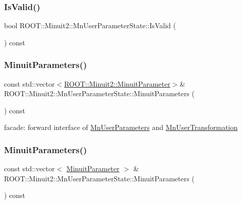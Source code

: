 \subsubsection{\texorpdfstring{IsValid()}{IsValid()}\hspace{0.1cm}{\footnotesize\ttfamily [2/2]}}
{\footnotesize\ttfamily bool R\+O\+O\+T\+::\+Minuit2\+::\+Mn\+User\+Parameter\+State\+::\+Is\+Valid (\begin{DoxyParamCaption}{ }\end{DoxyParamCaption}) const\hspace{0.3cm}{\ttfamily [inline]}}

\mbox{\label{classROOT_1_1Minuit2_1_1MnUserParameterState_ae37b475c33d32103702769cbfb1af5a4}} 
\subsubsection{\texorpdfstring{MinuitParameters()}{MinuitParameters()}\hspace{0.1cm}{\footnotesize\ttfamily [1/2]}}
{\footnotesize\ttfamily const std\+::vector$<$\mbox{\hyperlink{classROOT_1_1Minuit2_1_1MinuitParameter}{R\+O\+O\+T\+::\+Minuit2\+::\+Minuit\+Parameter}}$>$\& R\+O\+O\+T\+::\+Minuit2\+::\+Mn\+User\+Parameter\+State\+::\+Minuit\+Parameters (\begin{DoxyParamCaption}{ }\end{DoxyParamCaption}) const}

facade\+: forward interface of \mbox{\hyperlink{classROOT_1_1Minuit2_1_1MnUserParameters}{Mn\+User\+Parameters}} and \mbox{\hyperlink{classROOT_1_1Minuit2_1_1MnUserTransformation}{Mn\+User\+Transformation}} \mbox{\label{classROOT_1_1Minuit2_1_1MnUserParameterState_aa9ad12f80ace3d55a1055b836293beec}} 
\subsubsection{\texorpdfstring{MinuitParameters()}{MinuitParameters()}\hspace{0.1cm}{\footnotesize\ttfamily [2/2]}}
{\footnotesize\ttfamily const std\+::vector$<$ \mbox{\hyperlink{classROOT_1_1Minuit2_1_1MinuitParameter}{Minuit\+Parameter}} $>$ \& R\+O\+O\+T\+::\+Minuit2\+::\+Mn\+User\+Parameter\+State\+::\+Minuit\+Parameters (\begin{DoxyParamCaption}{ }\end{DoxyParamCaption}) const}

